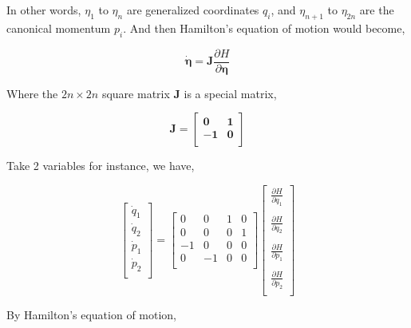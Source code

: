\documentclass[12pt]{article}
\begin{document}
In other words, $\eta_1$ to $\eta_n$ are generalized coordinates $q_i$, and $\eta_{n+1}$ to $\eta_{2n}$ are the canonical momentum $p_{i}$. And then Hamilton's equation of motion would become,

\begin{center}
    \[ \dot{\pmb{\eta}} = \pmb{J}\frac{\partial H}{\partial \pmb{\eta}}\]
\end{center}

Where the $2n \times 2n$ square matrix $\pmb{J}$ is a special matrix,

\begin{center}
    \[ \pmb{J} = \begin{bmatrix}
        \pmb{0} & \pmb{1}\\
        \pmb{-1} & \pmb{0}\\
    \end{bmatrix}\]
\end{center}

Take 2 variables for instance, we have,

\begin{center}
    \[ \begin{bmatrix}
        \dot{q}_1\\
        \dot{q}_2\\
        \dot{p}_1\\
        \dot{p}_2\\
    \end{bmatrix} = \begin{bmatrix}
        0 & 0 & 1 & 0\\
        0 & 0 & 0 & 1\\
        -1 & 0 & 0 & 0\\
        0 & -1 & 0 & 0\\
    \end{bmatrix} \begin{bmatrix}
        \frac{\partial H}{\partial q_1}\\\\
        \frac{\partial H}{\partial q_2}\\\\
        \frac{\partial H}{\partial p_1}\\\\
        \frac{\partial H}{\partial p_2}\\
    \end{bmatrix} \]
\end{center}

By Hamilton's equation of motion, 
\end{document}
